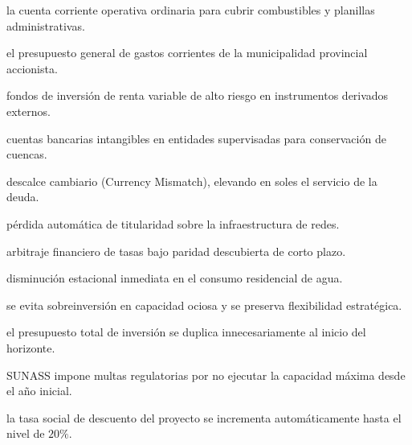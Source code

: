 \begin{opts}
    \item la cuenta corriente operativa ordinaria para cubrir combustibles y planillas administrativas.
    \item el presupuesto general de gastos corrientes de la municipalidad provincial accionista.
    \item fondos de inversión de renta variable de alto riesgo en instrumentos derivados externos.
    \item cuentas bancarias intangibles en entidades supervisadas para conservación de cuencas.
\end{opts}

\begin{opts}
    \item descalce cambiario (Currency Mismatch), elevando en soles el servicio de la deuda.
    \item pérdida automática de titularidad sobre la infraestructura de redes.
    \item arbitraje financiero de tasas bajo paridad descubierta de corto plazo.
    \item disminución estacional inmediata en el consumo residencial de agua.
\end{opts}

\begin{opts}
    \item se evita sobreinversión en capacidad ociosa y se preserva flexibilidad estratégica.
    \item el presupuesto total de inversión se duplica innecesariamente al inicio del horizonte.
    \item SUNASS impone multas regulatorias por no ejecutar la capacidad máxima desde el año inicial.
    \item la tasa social de descuento del proyecto se incrementa automáticamente hasta el nivel de $20\%$.
\end{opts}


